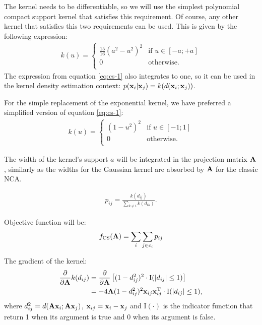 The kernel needs to be differentiable, so we will use the simplest polynomial compact support kernel that satisfies this requirement. Of course, any other kernel that satisfies this two requirements can be used. This is given by the following expression:
\begin{align}
	k(u)=\begin{cases}
		\frac{15}{16}(a^2-u^2)^2& \mbox{if } u \in [-a;+a]\\
		0& \mbox{otherwise}.\\
	\end{cases}
	\label{eq:cs-1}
\end{align}
The expression from equation \ref{eq:cs-1} also integrates to one, so it can be used in the kernel density estimation context: $p(\mathbf{x}_i|\mathbf{x}_j) = k(d(\mathbf{x}_i;\mathbf{x}_j))$. 

For the simple replacement of the exponential kernel, we have preferred a simplified version of equation \ref{eq:cs-1}: 
	\begin{align}
		k(u)=\begin{cases}
				(1-u^2)^2& \mbox{if } u \in [-1;1]\\
				0& \mbox{otherwise}.\\
			\end{cases}
			\label{eq:cs-2}
	\end{align}
	
	The width of the kernel's support $a$ will be integrated in the projection matrix $\mathbf{A}$, similarly as the widths for the Gaussian kernel are absorbed by $\mathbf{A}$ for the classic NCA.

\begin{align}
	p_{ij} = \frac{k(d_{ij})}{\sum_{k\neq i} k(d_{ik})}.
\end{align}

Objective function will be: 
\begin{align}
	f_\text{CS}(\mathbf{A}) = \sum_{i}\sum_{j\in c_i} p_{ij}
\end{align}

The gradient of the kernel:
\begin{align}
	\frac{\partial}{\partial\mathbf{A}}k(d_{ij}) 
	&= 	\frac{\partial}{\partial\mathbf{A}}\left[(1-d_{ij}^2)^2\cdot\mathrm{I}(\left|d_{ij}\right|\le 1)\right]\\
	&= -4\mathbf{A}(1-d_{ij}^2)^2  \mathbf{x}_{ij} \mathbf{x}_{ij}^\mathrm{T} \cdot \mathrm{I}(\left|d_{ij}\right|\le 1),
\end{align}
where $d_{ij}^2 = d(\mathbf{A}\mathbf{x}_i;\mathbf{A}\mathbf{x}_j)$, $\mathbf{x}_{ij}=\mathbf{x}_i-\mathbf{x}_j$ and $\mathrm{I}(\cdot)$ is the indicator function that return 1 when its argument is true and 0 when its argument is false.

